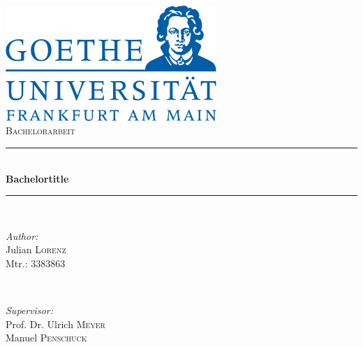 \begin{titlepage}

\newcommand{\HRule}{\rule{\linewidth}{0.5mm}} %

\center %
 
\label{Heading}
\includegraphics[width=8cm]{pictures/logo.png}\\[1.5cm] %
\textsc{\Large Bachelorarbeit}\\[0.5cm] %

\label{Title Section}
\HRule \\[0.5cm]
{ \huge \bfseries Bachelortitle}\\[0.3cm] %
\HRule \\[1.5cm]
 
\label{Author}
\begin{minipage}{0.4\textwidth}
\begin{flushleft} \large
\emph{Author:}\\
Julian \textsc{Lorenz}\\
Mtr.: 3383863 %
\end{flushleft}
\end{minipage}
~
\begin{minipage}{0.4\textwidth}
\begin{flushright} \large
\emph{Supervisor:} \\
Prof. Dr. Ulrich \textsc{Meyer}\\
Manuel \textsc{Penschuck}
\end{flushright}
\end{minipage}\\[4cm]



\end{titlepage}
